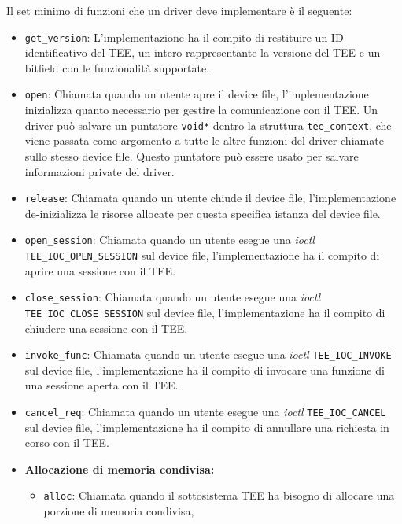 \documentclass[12pt,italian]{report}
\begin{document}
Il set minimo di funzioni che un driver deve implementare è il seguente:
\begin{itemize}
    \item \texttt{get\_version}: L'implementazione ha il compito di restituire
        un ID identificativo del TEE, un intero rappresentante la versione
        del TEE e un bitfield con le funzionalità supportate.
    \item \texttt{open}: Chiamata quando un utente apre il device file,
        l'implementazione inizializza quanto necessario per gestire la
        comunicazione con il TEE.
        Un driver può salvare un puntatore \texttt{void*} dentro la struttura
        \texttt{tee\_context}, che viene passata come argomento a tutte le
        altre funzioni del driver chiamate sullo stesso device file.
        Questo puntatore può essere usato per salvare informazioni private
        del driver.
    \item \texttt{release}: Chiamata quando un utente chiude il device file,
        l'implementazione de-inizializza le risorse allocate per questa
        specifica istanza del device file.
    \item \texttt{open\_session}: Chiamata quando un utente esegue una
        \textit{ioctl} \\
        \texttt{TEE\_IOC\_OPEN\_SESSION} sul device file,
        l'implementazione ha il compito di aprire una sessione con il TEE.
    \item \texttt{close\_session}: Chiamata quando un utente esegue una
        \textit{ioctl} \\
        \texttt{TEE\_IOC\_CLOSE\_SESSION} sul device file,
        l'implementazione ha il compito di chiudere una sessione con il TEE.
    \item \texttt{invoke\_func}: Chiamata quando un utente esegue una
        \textit{ioctl} \texttt{TEE\_IOC\_INVOKE} sul device file,
        l'implementazione ha il compito di invocare una funzione di una
        sessione aperta con il TEE.
    \item \texttt{cancel\_req}: Chiamata quando un utente esegue una
        \textit{ioctl} \texttt{TEE\_IOC\_CANCEL} sul device file,
        l'implementazione ha il compito di annullare una richiesta in
        corso con il TEE.
    \item \textbf{Allocazione di memoria condivisa: }
    \begin{itemize}
        \item \texttt{alloc}: Chiamata quando il sottosistema TEE ha
            bisogno di allocare una porzione di memoria condivisa,

\end{itemize}
\end{itemize}
\end{document}
